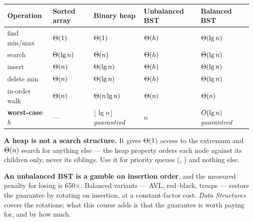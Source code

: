 \begin{conceptbox}
\begin{longtable}{@{}L{2.8cm}L{2.4cm}L{2.4cm}L{2.4cm}L{3.3cm}@{}}
\toprule
{}
\textbf{Operation} & \textbf{Sorted array} & \textbf{Binary heap} &
\textbf{Unbalanced BST} & \textbf{Balanced BST} \\
\midrule
\endhead
find min/max & $\Theta(1)$ & $\Theta(1)$ & $\Theta(h)$ & $\Theta(\operatorname{lg} n)$ \\
search & $\Theta(\operatorname{lg} n)$ & $\Theta(n)$ & $\Theta(h)$ & $\Theta(\operatorname{lg} n)$ \\
insert & $\Theta(n)$ & $\Theta(\operatorname{lg} n)$ & $\Theta(h)$ & $\Theta(\operatorname{lg} n)$ \\
delete min & $\Theta(n)$ & $\Theta(\operatorname{lg} n)$ & $\Theta(h)$ & $\Theta(\operatorname{lg} n)$ \\
in-order walk & $\Theta(n)$ & $\Theta(n\operatorname{lg} n)$ & $\Theta(n)$ & $\Theta(n)$ \\
\textbf{worst-case $h$} & --- & $\lfloor\lg n\rfloor$ \emph{guaranteed} &
  $n$ & $O(\operatorname{lg} n)$ \emph{guaranteed} \\
\bottomrule
\end{longtable}

\smallskip
\textbf{A heap is not a search structure.} It gives $\Theta(1)$ access to the
extremum and $\Theta(n)$ search for anything else --- the heap property orders
each node against its children only, never its siblings. Use it for priority
queues (, ) and nothing else.

\smallskip
\textbf{An unbalanced BST is a gamble on insertion order}, and the measured
penalty for losing is 650$\times$. Balanced variants --- AVL, red--black,
treaps --- restore the guarantee by rotating on insertion, at a constant-factor
cost. \emph{Data Structures} covers the rotations; what this course adds is
that the guarantee is worth paying for, and by how much.
\end{conceptbox}

